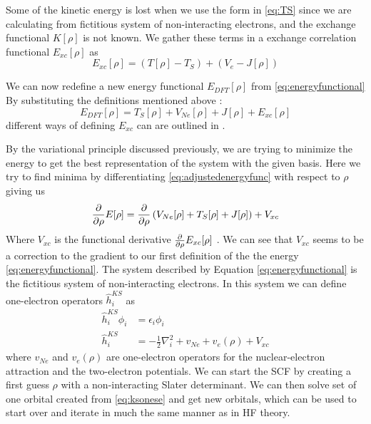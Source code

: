 \documentclass[../master_thesis.tex]{subfiles}
\begin{document}
Some of the kinetic energy is lost when we use the form in \ref{eq:TS} since we are calculating
from fictitious system of non-interacting electrons, and the exchange
functional $K[\rho]$ is not known. We gather these terms in a exchange correlation
functional $E_{xc}[\rho]$ as \cite{Jensen:2017}
\begin{equation}
  E_{xc}[\rho] = \left(T[\rho] - T_S\right) + \left(V_{e} - J[\rho]\right)
\end{equation}

We can now redefine a new energy functional $E_{DFT}[\rho]$  from \ref{eq:energyfunctional}
By substituting the definitions mentioned above \cite{Jensen:2017}:
\begin{equation}\label{eq:adjustedenergyfunc}
  E_{DFT}[\rho] = T_S[\rho] + V_{Ne}[\rho] + J[\rho] + E_{xc}[\rho]
\end{equation}
different ways of defining $E_{xc}$ can are outlined in \cite{Cramer:2004, Jensen:2017}.

By the variational principle discussed previously, we are trying to minimize the energy
to get the best representation of the system with the given basis. Here we try to
find minima by differentiating \ref{eq:adjustedenergyfunc} with respect to $\rho$ giving us
\begin{align}\label{eq:energyderiv}
   \frac{\partial}{\partial \rho}E[\rho] = \frac{\partial}{\partial \rho}\left( V_{Ne}[\rho] + T_S[\rho] + J[\rho]\right) + V_{xc}
\end{align}
Where $V_{xc}$ is the functional derivative $\frac{\partial}{\partial \rho}E_{xc}[\rho]$ \cite{Cramer:2004}.
We can see that $V_{xc}$ seems to be a correction to the gradient to our first definition
of the the energy \ref{eq:energyfunctional}. The system described by Equation
\ref{eq:energyfunctional} is the fictitious system of  non-interacting electrons. In this
system we can define one-electron operators $\hat{h}_i^{KS}$ as
\begin{align}
  \hat{h}_i^{KS} \phi_i &= \epsilon_i \phi_i\label{eq:ksonese} \\
  \hat{h}_i^{KS} &= - \frac{1}{2}\nabla^2_i + v_{Ne} + v_e(\rho) + V_{xc}
\end{align}
where $v_{Ne}$ and $v_e(\rho)$ are one-electron operators for the nuclear-electron attraction and the
two-electron potentials.
We can start the \ac{SCF} by creating a first guess $\rho$ with a non-interacting Slater determinant.
We can then solve set of one orbital \SE created from \ref{eq:ksonese} and get new orbitals,
which can be used to start over and iterate in much the same manner as in \ac{HF} theory.


\biblio
\end{document}
